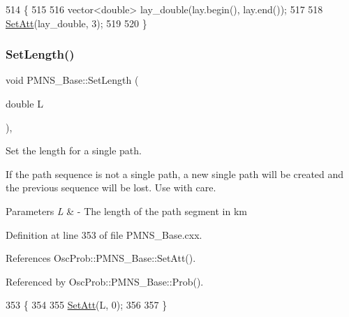 \begin{DoxyCode}
514                                            \{
515 
516   vector<double> lay\_double(lay.begin(), lay.end());
517 
518   \hyperlink{classOscProb_1_1PMNS__Base_aba565962a440d14bee7a2a96d2eca2c5}{SetAtt}(lay\_double, 3);
519 
520 \}
\end{DoxyCode}
\mbox{\label{classOscProb_1_1PMNS__Base_a6241325b1bd28cafa556daaecbe4ed62}} 
\subsubsection{\texorpdfstring{Set\+Length()}{SetLength()}\hspace{0.1cm}{\footnotesize\ttfamily [1/2]}}
{\footnotesize\ttfamily void P\+M\+N\+S\+\_\+\+Base\+::\+Set\+Length (\begin{DoxyParamCaption}\item[{double}]{L }\end{DoxyParamCaption})\hspace{0.3cm}{\ttfamily [virtual]}, {\ttfamily [inherited]}}

Set the length for a single path.

If the path sequence is not a single path, a new single path will be created and the previous sequence will be lost. Use with care.


\begin{DoxyParams}{Parameters}
{\em L} & -\/ The length of the path segment in km \\
\hline
\end{DoxyParams}


Definition at line 353 of file P\+M\+N\+S\+\_\+\+Base.\+cxx.



References Osc\+Prob\+::\+P\+M\+N\+S\+\_\+\+Base\+::\+Set\+Att().



Referenced by Osc\+Prob\+::\+P\+M\+N\+S\+\_\+\+Base\+::\+Prob().


\begin{DoxyCode}
353                                  \{
354 
355   \hyperlink{classOscProb_1_1PMNS__Base_aba565962a440d14bee7a2a96d2eca2c5}{SetAtt}(L, 0);
356 
357 \}
\end{DoxyCode}
\mbox{\label{classOscProb_1_1PMNS__Base_aa34a40a3b5abda0f252982d9ead3b520}} 
